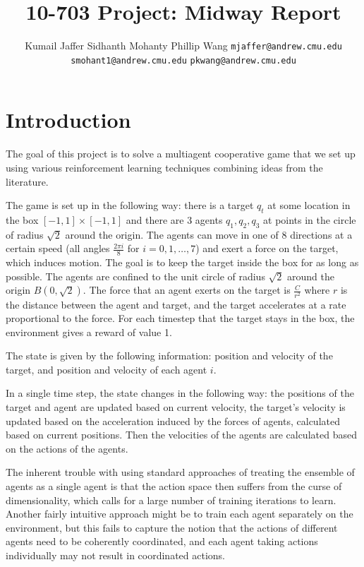 \documentclass{article}
\title{10-703 Project: Midway Report}
\author{Kumail Jaffer \And Sidhanth Mohanty \And Phillip
Wang
\AND
\texttt{mjaffer@andrew.cmu.edu} \And
\texttt{smohant1@andrew.cmu.edu}\And
\texttt{pkwang@andrew.cmu.edu}}
\begin{document}
\maketitle

\section{Introduction}
The goal of this project is to solve a multiagent
cooperative game that we set up using various
reinforcement learning techniques combining ideas
from the literature.

The game is set up in the following way: there is a target
$q_t$ at some location in the box $[-1,1]\times[-1,1]$
and there are 3 agents $q_1,q_2,q_3$ at points in the circle of
radius $\sqrt{2}$ around the origin. The agents can move
in one of 8 directions at a certain speed (all angles
$\frac{2\pi i}{8}$ for $i=0,1,\ldots,7$) and exert a force
on the target, which induces motion. The goal is to
keep the target inside the box for as long as possible.
The agents are confined to the unit circle of radius
$\sqrt{2}$ around the origin $B(0,\sqrt{2})$.
The force that an agent exerts on the target is $\frac{C}{r^2}$
where $r$ is the distance between the agent and target, and
the target accelerates at a rate proportional to the force.
For each timestep that the target stays in the box, the
environment gives a reward of value 1.

The state is given by the following information: position and velocity
of the target, and position and velocity of each agent $i$.

In a single time step, the state changes in the following way:
the positions of the target and agent are updated based on
current velocity, the target's velocity is updated
based on the acceleration induced by the forces
of agents, calculated based on current positions. Then the
velocities of the agents are calculated based on the
actions of the agents.

The inherent trouble with using standard approaches of treating
the ensemble of agents as a single agent is that the action
space then suffers from the curse of dimensionality, which
calls for a large number of training iterations to
learn. Another fairly intuitive approach might be to
train each agent separately on the environment, but
this fails to capture the notion that the actions of
different agents need to be coherently coordinated,
and each agent taking actions individually may not
result in coordinated actions.
\end{document}

